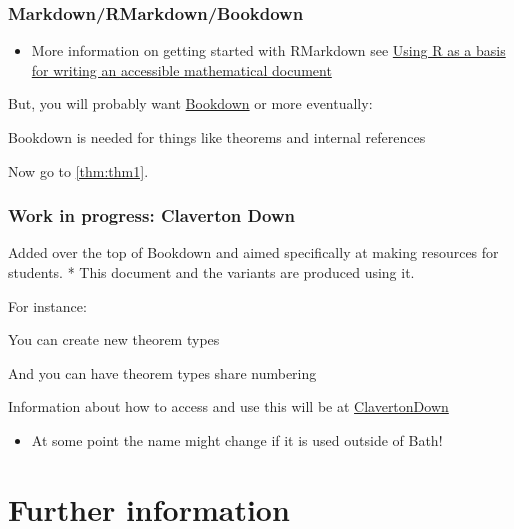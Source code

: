 \documentclass[
  10pt,
  english,
  a4paper]{article}
\providecommand{\tightlist}{%
  \setlength{\itemsep}{0pt}\setlength{\parskip}{0pt}}
\theoremstyle{plain}
\theoremstyle{plain}
\theoremstyle{plain}
\theoremstyle{plain}
\theoremstyle{plain}
\theoremstyle{definition}
\theoremstyle{definition}
\theoremstyle{definition}
\theoremstyle{remark}
\let\BeginKnitrBlock\begin \let\EndKnitrBlock\end
\begin{document}
\hypertarget{markdownrmarkdownbookdown}{%
\subsubsection{Markdown/RMarkdown/Bookdown}\label{markdownrmarkdownbookdown}}

\begin{itemize}
\tightlist
\item
  More information on getting started with RMarkdown see \href{https://stem-enable.github.io/RMarkdownWorkshop/}{Using R as a basis for writing an accessible mathematical document}
\end{itemize}

But, you will probably want \href{https://bookdown.org/}{Bookdown} or more eventually:

\BeginKnitrBlock{theorem}
\label{thm:thm1} Bookdown is needed for things like theorems and internal references
\EndKnitrBlock{theorem}

Now go to \ref{thm:thm1}.

\hypertarget{work-in-progress-claverton-down}{%
\subsubsection{Work in progress: Claverton Down}\label{work-in-progress-claverton-down}}

Added over the top of Bookdown and aimed specifically at making resources for students.
* This document and the variants are produced using it.

For instance:

\BeginKnitrBlock{Thought}
\protect\hypertarget{Thought:tho1}{}{ \label{tho:tho1} }You can create new theorem types
\EndKnitrBlock{Thought}

\BeginKnitrBlock{Nugget}
\protect\hypertarget{Nugget:nug1}{}{ \label{nug:nug1} }And you can have theorem types share numbering
\EndKnitrBlock{Nugget}

Information about how to access and use this will be at \href{https://github.com/BathMASH/clavertondown\#readme}{ClavertonDown}

\begin{itemize}
\tightlist
\item
  At some point the name might change if it is used outside of Bath!
\end{itemize}

\hypertarget{further-information}{%
\section{Further information}\label{further-information}}
\end{document}
